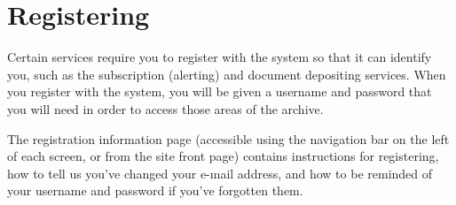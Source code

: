 \section{Registering}


Certain services require you to register with the system so that it can identify you, such as the subscription (alerting) and document depositing services. When you register with the system, you will be given a username and password that you will need in order to access those areas of the archive.

The registration information page (accessible using the navigation bar on the left of each screen, or from the site front page) contains instructions for registering, how to tell us you've changed your e-mail address, and how to be reminded of your username and password if you've forgotten them.
